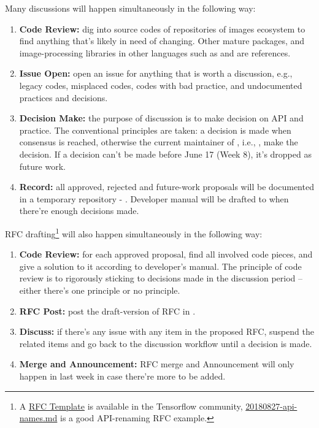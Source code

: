 Many discussions will happen simultaneously in the following way:
\begin{enumerate}
    \item \textbf{Code Review:} dig into source codes of repositories of images ecosystem to find anything that's likely in need of changing. Other mature \langjulia{} packages, and image-processing libraries in other languages such as \reposcikitimage{} and \matlabimageprocessing{} are references.
    \item \textbf{Issue Open:} open an issue for anything that is worth a discussion, e.g., legacy codes, misplaced codes, codes with bad practice, and undocumented practices and decisions.
    \item \textbf{Decision Make:} the purpose of discussion is to make decision on API and practice. The conventional principles are taken: a decision is made when consensus is reached, otherwise the current maintainer of \images{}, i.e., \timholy , make the decision. If a decision can't be made before June 17 (Week 8), it's dropped as future work.
    \item \textbf{Record:} all approved, rejected and future-work proposals will be documented in a temporary repository - \repogsoctempdoc{}. Developer manual will be drafted to \repoimagesgithubio{} when there're enough decisions made.
\end{enumerate}

RFC drafting\footnote{A \href{https://github.com/tensorflow/community/blob/master/rfcs/yyyymmdd-rfc-template.md}{RFC Template} is available in the Tensorflow community,  \href{https://github.com/tensorflow/community/blob/master/rfcs/20180827-api-names.md}{20180827-api-names.md} is a good API-renaming RFC example.} will also happen simultaneously in the following way:
\begin{enumerate}
    \item \textbf{Code Review:} for each approved proposal, find all involved code pieces, and give a solution to it according to developer's manual. The principle of code review is to rigorously sticking to decisions made in the discussion period -- either there's one principle or no principle.
    \item \textbf{RFC Post:} post the draft-version of RFC in \repogsoctempdoc{}.
    \item \textbf{Discuss:} if there's any issue with any item in the proposed RFC, suspend the related items and go back to the discussion workflow until a decision is made.
    \item \textbf{Merge and Announcement:} RFC merge and Announcement will only happen in last week in case there're more to be added.
\end{enumerate}

